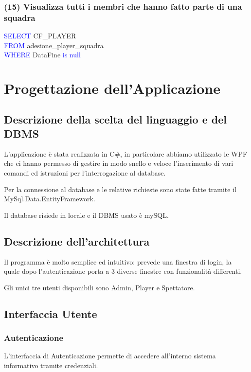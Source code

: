 \documentclass[a4paper,12pt]{report}
\begin{document}
\subsection*{(15)  Visualizza tutti i membri che hanno fatto parte di una squadra}
\textcolor{blue}{SELECT}  CF\_PLAYER\\
\noindent\textcolor{blue}{FROM} adesione\_player\_squadra\\
\noindent\textcolor{blue}{WHERE} DataFine \textcolor{blue}{is null}
\chapter{Progettazione dell'Applicazione}
\section{Descrizione della scelta del linguaggio e del DBMS}
L’applicazione è stata realizzata in C\#, in particolare abbiamo utilizzato le WPF che ci hanno permesso di gestire in modo snello e veloce l’inserimento di vari comandi ed istruzioni per l’interrogazione al database. 

Per la connessione al database e le relative richieste sono state fatte tramite il MySql.Data.EntityFramework. 

Il database risiede in locale e il DBMS usato è mySQL.

\section{Descrizione dell'architettura}
Il programma è molto semplice ed intuitivo: prevede una finestra di login, la quale dopo l'autenticazione porta a 3 diverse finestre con funzionalità differenti. 

Gli unici tre utenti disponibili sono Admin, Player e Spettatore.
\section{Interfaccia Utente}
\subsection{Autenticazione}
L'interfaccia di Autenticazione permette di accedere all'interno sistema informativo tramite credenziali. 
\end{document}
